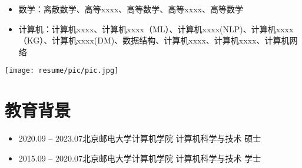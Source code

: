 \documentclass{resume}
\begin{document}

\begin{minipage}{0.8\textwidth}
  \begin{normalsize}
    \begin{itemize}[parsep=0.5ex]
      \item 数学：离散数学、高等xxxx、高等数学、高等xxxx、高等数学
      \item 计算机：计算机xxxx、计算机xxxx（ML）、计算机xxxx(NLP)、计算机xxxx（KG）、计算机xxxx(DM)、数据结构、计算机xxxx、计算机xxxx、计算机网络
    \end{itemize}
  \end{normalsize}
\end{minipage}
\begin{minipage}{0.2\textwidth}
\centering
\texttt{[image: resume/pic/pic.jpg]}
\end{minipage}

\section{教育背景}
\begin{normalsize}
  \begin{itemize}[parsep=0.5ex]
    \item {2020.09 -- 2023.07}\hspace{1cm}北京邮电大学计算机学院  \hspace{1cm} 计算机科学与技术  \hspace{1.4cm} 硕士
    \item {2015.09 -- 2020.07}\hspace{1cm}北京邮电大学计算机学院  \hspace{1cm} 计算机科学与技术 \hspace{1.4cm} 学士
  \end{itemize}
\end{normalsize}
\end{document}
